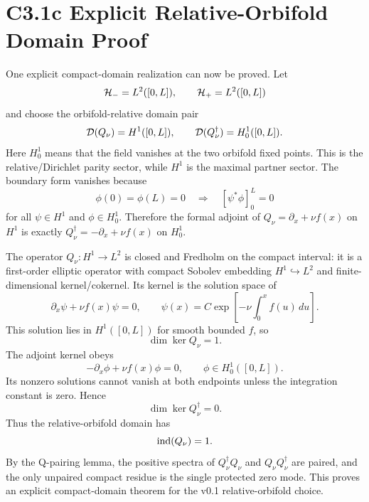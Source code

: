 \documentclass[11pt]{article}
\begin{document}
\section{C3.1c Explicit Relative-Orbifold Domain Proof}
One explicit compact-domain realization can now be proved.  Let
\begin{equation}
{\cal H}_-=L^2([0,L]),\qquad {\cal H}_+=L^2([0,L])
\end{equation}
and choose the orbifold-relative domain pair
\begin{equation}
{\cal D}(Q_\nu)=H^1([0,L]),\qquad
{\cal D}(Q_\nu^\dagger)=H^1_0([0,L]).
\end{equation}
Here $H^1_0$ means that the field vanishes at the two orbifold fixed points.
This is the relative/Dirichlet parity sector, while $H^1$ is the maximal
partner sector.  The boundary form vanishes because
\begin{equation}
\phi(0)=\phi(L)=0
\quad\Longrightarrow\quad
\left[\psi^*\phi\right]_0^L=0
\end{equation}
for all $\psi\in H^1$ and $\phi\in H^1_0$.  Therefore the formal adjoint of
$Q_\nu=\partial_x+\nu f(x)$ on $H^1$ is exactly
$Q_\nu^\dagger=-\partial_x+\nu f(x)$ on $H^1_0$.

The operator $Q_\nu:H^1\to L^2$ is closed and Fredholm on the compact interval:
it is a first-order elliptic operator with compact Sobolev embedding
$H^1\hookrightarrow L^2$ and finite-dimensional kernel/cokernel.  Its kernel is
the solution space of
\begin{equation}
\partial_x\psi+\nu f(x)\psi=0,
\qquad
\psi(x)=C\exp\left[-\nu\int_0^x f(u)\,du\right].
\end{equation}
This solution lies in $H^1([0,L])$ for smooth bounded $f$, so
\begin{equation}
\dim\ker Q_\nu=1.
\end{equation}
The adjoint kernel obeys
\begin{equation}
-\partial_x\phi+\nu f(x)\phi=0,\qquad \phi\in H^1_0([0,L]).
\end{equation}
Its nonzero solutions cannot vanish at both endpoints unless the integration
constant is zero.  Hence
\begin{equation}
\dim\ker Q_\nu^\dagger=0.
\end{equation}
Thus the relative-orbifold domain has
\begin{equation}
{\rm ind}(Q_\nu)=1.
\end{equation}
By the Q-pairing lemma, the positive spectra of $Q_\nu^\dagger Q_\nu$ and
$Q_\nu Q_\nu^\dagger$ are paired, and the only unpaired compact residue is the
single protected zero mode.  This proves an explicit compact-domain theorem for
the v0.1 relative-orbifold choice.
\end{document}
